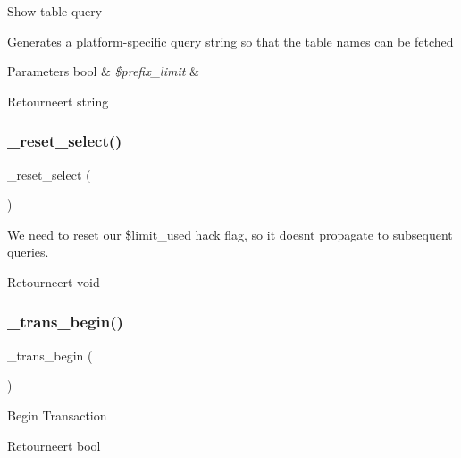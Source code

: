 Show table query

Generates a platform-\/specific query string so that the table names can be fetched


\begin{DoxyParams}[1]{Parameters}
bool & {\em \$prefix\+\_\+limit} & \\
\hline
\end{DoxyParams}
\begin{DoxyReturn}{Retourneert}
string 
\end{DoxyReturn}
\mbox{\label{class_c_i___d_b__oci8__driver_a7c6cc16411b9c36fbfd42a9317f64317}} 
\subsubsection{\texorpdfstring{\_reset\_select()}{\_reset\_select()}}
{\footnotesize\ttfamily \+\_\+reset\+\_\+select (\begin{DoxyParamCaption}{ }\end{DoxyParamCaption})\hspace{0.3cm}{\ttfamily [protected]}}

We need to reset our \$limit\+\_\+used hack flag, so it doesn\textquotesingle{}t propagate to subsequent queries.

\begin{DoxyReturn}{Retourneert}
void 
\end{DoxyReturn}
\mbox{\label{class_c_i___d_b__oci8__driver_ac81ac882c1d54347d810199a15856aac}} 
\subsubsection{\texorpdfstring{\_trans\_begin()}{\_trans\_begin()}}
{\footnotesize\ttfamily \+\_\+trans\+\_\+begin (\begin{DoxyParamCaption}{ }\end{DoxyParamCaption})\hspace{0.3cm}{\ttfamily [protected]}}

Begin Transaction

\begin{DoxyReturn}{Retourneert}
bool 
\end{DoxyReturn}
\mbox{\label{class_c_i___d_b__oci8__driver_a6fe7f373e0b11cfae23a5f41c0b35dda}} 
